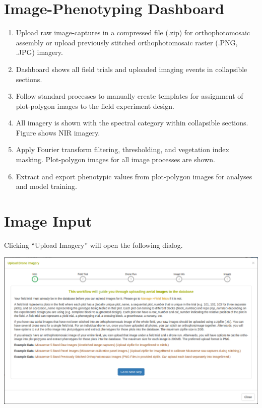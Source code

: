 \documentclass[
  12pt,
]{book}
\providecommand{\tightlist}{%
  \setlength{\itemsep}{0pt}\setlength{\parskip}{0pt}}
\begin{document}
\hypertarget{image-phenotyping-dashboard}{%
\section{Image-Phenotyping Dashboard}\label{image-phenotyping-dashboard}}

\begin{enumerate}
\def\labelenumi{\arabic{enumi}.}
\tightlist
\item
  Upload raw image-captures in a compressed file (.zip) for orthophotomosaic assembly or upload previously stitched orthophotomosaic raster (.PNG, .JPG) imagery.
\item
  Dashboard shows all field trials and uploaded imaging events in collapsible sections.
\item
  Follow standard processes to manually create templates for assignment of plot-polygon images to the field experiment design.
\item
  All imagery is shown with the spectral category within collapsible sections. Figure shows NIR imagery.
\item
  Apply Fourier transform filtering, thresholding, and vegetation index masking. Plot-polygon images for all image processes are shown.
\item
  Extract and export phenotypic values from plot-polygon images for analyses and model training.
\end{enumerate}

\hypertarget{image-input}{%
\section{Image Input}\label{image-input}}

Clicking ``Upload Imagery'' will open the following dialog.

\begin{center}\includegraphics[width=0.95\linewidth]{assets/images/manage_image_phenotyping_upload_intro} \end{center}
\end{document}
